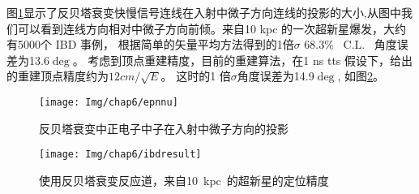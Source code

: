 图\ref{fig:epnnu}显示了反贝塔衰变快慢信号连线在入射中微子方向连线的投影的大小,从图中我们可以看到连线方向相对中微子方向前倾。来自10 kpc 的一次超新星爆发，大约有5000个 IBD 事例， 根据简单的矢量平均方法得到的1倍$\sigma$ 68.3\% ~C.L.~ 角度误差为13.6$\deg$。 考虑到顶点重建精度，目前的重建算法，在1 ns tts 假设下，给出的重建顶点精度约为$12cm/\sqrt{E}$。 这时的1 倍$\sigma$角度误差为14.9$\deg$, 如图\ref{fig:ibdf}。

\begin{figure}[!htbp]
  \centering
   \texttt{[image: Img/chap6/epnnu]}
    \caption{反贝塔衰变中正电子中子在入射中微子方向的投影}
  \label{fig:epnnu}
\end{figure}
\begin{figure}[!htbp]
  \centering
   \texttt{[image: Img/chap6/ibdresult]}
    \caption{使用反贝塔衰变反应道，来自10~kpc~的超新星的定位精度}
  \label{fig:ibdf}
\end{figure}

